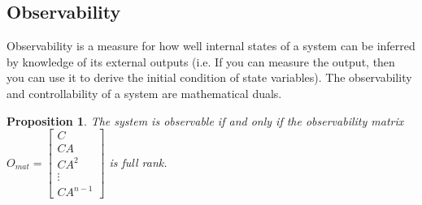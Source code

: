 \documentclass{article}
\newtheorem{prop}{Proposition}
\begin{document}
\subsection{Observability}
Observability is a measure for how well internal states of a system can be inferred by knowledge of its external outputs (i.e. If you can measure the output, then you can use it to derive the initial condition of state variables). The observability and controllability of a system are mathematical duals.
\begin{prop}
The system is observable if and only if the observability matrix $O_{mat}= \left[ \begin{array}{ccccc} C \\ CA \\ CA^2 \\ \vdots \\CA^{n-1} \end{array} \right]$ is full rank.
\end{prop}





%
\end{document}
